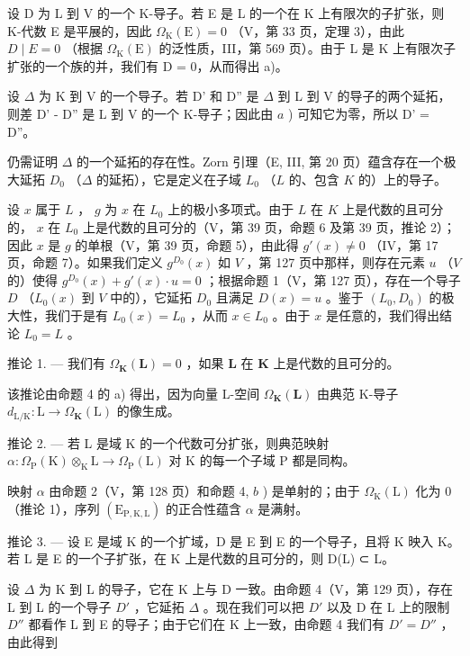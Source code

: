 设 D 为 L 到 V 的一个 K-导子。若 E 是 L 的一个在 K 上有限次的子扩张，则 K-代数 E 是平展的，因此 \(\Omega_{\mathrm{K}}(\mathrm{E}) = 0\) （V，第 33 页，定理 3），由此 \(D \mid E = 0\) （根据 \(\Omega_{\mathrm{K}}(\mathrm{E})\) 的泛性质，III，第 569 页）。由于 L 是 K 上有限次子扩张的一个族的并，我们有 D = 0，从而得出 a)。

设 \(\Delta\) 为 K 到 V 的一个导子。若 D' 和 D'' 是 \(\Delta\) 到 L 到 V 的导子的两个延拓，则差 D' - D'' 是 L 到 V 的一个 K-导子；因此由 \(a\) ) 可知它为零，所以 D' = D''。

仍需证明 \(\Delta\) 的一个延拓的存在性。Zorn 引理（E, III, 第 20 页）蕴含存在一个极大延拓 \(D_0\) （\(\Delta\) 的延拓），它是定义在子域 \(L_0\) （\(L\) 的、包含 \(K\) 的）上的导子。

设 \(x\) 属于 \(L\) ， \(g\) 为 \(x\) 在 \(L_0\) 上的极小多项式。由于 \(L\) 在 \(K\) 上是代数的且可分的， \(x\) 在 \(L_0\) 上是代数的且可分的（V，第 39 页，命题 6 及第 39 页，推论 2）；因此 \(x\) 是 \(g\) 的单根（V，第 39 页，命题 5），由此得 \(g'(x) \neq 0\) （IV，第 17 页，命题 7）。如果我们定义 \(g^{D_0}(x)\) 如 \(V\) ，第 127 页中那样，则存在元素 \(u\) （\(V\) 的）使得 \(g^{D_0}(x) + g'(x) \cdot u = 0\) ；根据命题 1（V，第 127 页），存在一个导子 \(D\) （\(L_0(x)\) 到 \(V\) 中的），它延拓 \(D_0\) 且满足 \(D(x) = u\) 。鉴于 \((L_0, D_0)\) 的极大性，我们于是有 \(L_0(x) = L_0\) ，从而 \(x \in L_0\) 。由于 \(x\) 是任意的，我们得出结论 \(L_0 = L\) 。

推论 1. --- 我们有 \(\Omega_{\mathbf{K}}(\mathbf{L}) = 0\) ，如果 \(\mathbf{L}\) 在 \(\mathbf{K}\) 上是代数的且可分的。

该推论由命题 4 的 a) 得出，因为向量 L-空间 \(\Omega_{\mathbf{K}}(\mathbf{L})\) 由典范 K-导子 \(d_{\mathrm{L / K}}: \mathrm{L} \to \Omega_{\mathbf{K}}(\mathrm{L})\) 的像生成。

推论 2. --- 若 L 是域 K 的一个代数可分扩张，则典范映射 \(\alpha: \Omega_{\mathrm{P}}(\mathrm{K}) \otimes_{\mathrm{K}} \mathrm{L} \to \Omega_{\mathrm{P}}(\mathrm{L})\) 对 K 的每一个子域 P 都是同构。

映射 \(\alpha\) 由命题 2（V，第 128 页）和命题 4, \(b\) ) 是单射的；由于 \(\Omega_{\mathrm{K}}(\mathrm{L})\) 化为 0（推论 1），序列 \((\mathrm{E}_{\mathrm{P},\mathrm{K},\mathrm{L}})\) 的正合性蕴含 \(\alpha\) 是满射。

推论 3. --- 设 E 是域 K 的一个扩域，D 是 E 到 E 的一个导子，且将 K 映入 K。若 L 是 E 的一个子扩张，在 K 上是代数的且可分的，则 D(L) ⊂ L。

设 \(\Delta\) 为 K 到 L 的导子，它在 K 上与 D 一致。由命题 4（V，第 129 页），存在 L 到 L 的一个导子 \(D'\) ，它延拓 \(\Delta\) 。现在我们可以把 \(D'\) 以及 D 在 L 上的限制 \(D''\) 都看作 L 到 E 的导子；由于它们在 K 上一致，由命题 4 我们有 \(D' = D''\) ，由此得到

